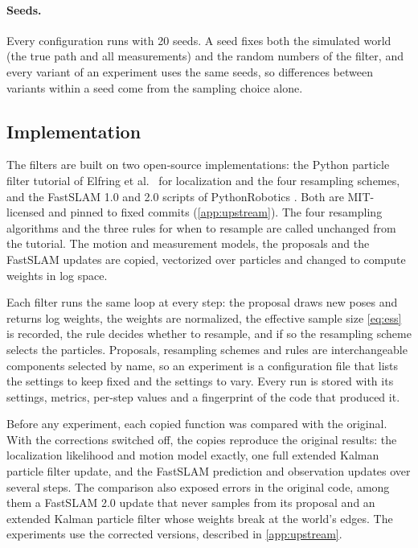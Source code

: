 \paragraph{Seeds.} Every configuration runs with 20 seeds. A seed fixes both the simulated world (the true path and
all measurements) and the random numbers of the filter, and every variant of an experiment uses the same seeds, so
differences between variants within a seed come from the sampling choice alone.

\subsection{Implementation}

The filters are built on two open-source implementations: the Python particle filter tutorial of Elfring et al.\
\cite{elfring2021particle} for localization and the four resampling schemes, and the FastSLAM 1.0 and 2.0 scripts of
PythonRobotics \cite{sakai2018pythonrobotics}. Both are MIT-licensed and pinned to fixed commits (\cref{app:upstream}). The four resampling algorithms
and the three rules for when to resample are called unchanged from the tutorial. The motion and measurement models,
the proposals and the FastSLAM updates are copied, vectorized over particles and changed to compute weights in log
space.

Each filter runs the same loop at every step: the proposal draws new poses and returns log weights, the weights are
normalized, the effective sample size \eqref{eq:ess} is recorded, the rule decides whether to resample, and if so the
resampling scheme selects the particles. Proposals, resampling schemes and rules are interchangeable components
selected by name, so an experiment is a configuration file that lists the settings to keep fixed and the settings to
vary. Every run is stored with its settings, metrics, per-step values and a fingerprint of the code that produced it.

Before any experiment, each copied function was compared with the original. With the corrections switched off, the
copies reproduce the original results: the localization likelihood and motion model exactly, one full extended Kalman
particle filter update, and the FastSLAM prediction and observation updates over several steps. The comparison also
exposed errors in the original code, among them a FastSLAM 2.0 update that never samples from its proposal and an
extended Kalman particle filter whose weights break at the world's edges. The experiments use the corrected versions,
described in \cref{app:upstream}.

